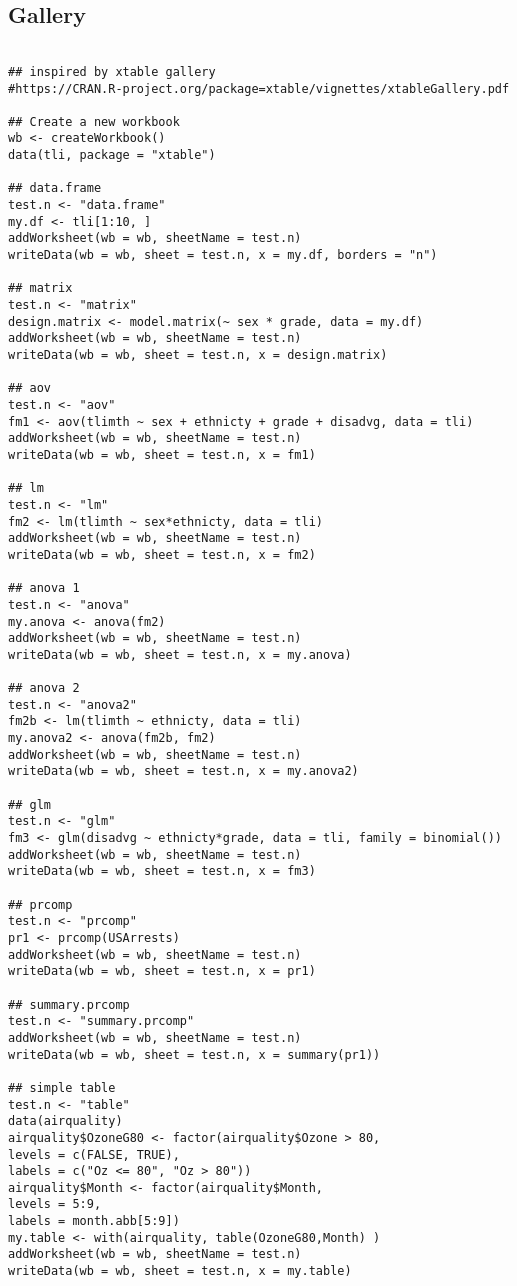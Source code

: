 \documentclass[11pt]{article}\usepackage[]{graphicx}\usepackage[]{color}
\begin{document}
\newpage
\subsection{Gallery}
\begin{verbatim}

## inspired by xtable gallery
#https://CRAN.R-project.org/package=xtable/vignettes/xtableGallery.pdf

## Create a new workbook
wb <- createWorkbook()
data(tli, package = "xtable")

## data.frame
test.n <- "data.frame"
my.df <- tli[1:10, ]
addWorksheet(wb = wb, sheetName = test.n)
writeData(wb = wb, sheet = test.n, x = my.df, borders = "n")

## matrix
test.n <- "matrix"
design.matrix <- model.matrix(~ sex * grade, data = my.df)
addWorksheet(wb = wb, sheetName = test.n)
writeData(wb = wb, sheet = test.n, x = design.matrix)

## aov
test.n <- "aov"
fm1 <- aov(tlimth ~ sex + ethnicty + grade + disadvg, data = tli)
addWorksheet(wb = wb, sheetName = test.n)
writeData(wb = wb, sheet = test.n, x = fm1)

## lm
test.n <- "lm"
fm2 <- lm(tlimth ~ sex*ethnicty, data = tli)
addWorksheet(wb = wb, sheetName = test.n)
writeData(wb = wb, sheet = test.n, x = fm2)

## anova 1 
test.n <- "anova"
my.anova <- anova(fm2)
addWorksheet(wb = wb, sheetName = test.n)
writeData(wb = wb, sheet = test.n, x = my.anova)

## anova 2
test.n <- "anova2"
fm2b <- lm(tlimth ~ ethnicty, data = tli)
my.anova2 <- anova(fm2b, fm2)
addWorksheet(wb = wb, sheetName = test.n)
writeData(wb = wb, sheet = test.n, x = my.anova2)

## glm
test.n <- "glm"
fm3 <- glm(disadvg ~ ethnicty*grade, data = tli, family = binomial())
addWorksheet(wb = wb, sheetName = test.n)
writeData(wb = wb, sheet = test.n, x = fm3)

## prcomp
test.n <- "prcomp"
pr1 <- prcomp(USArrests)
addWorksheet(wb = wb, sheetName = test.n)
writeData(wb = wb, sheet = test.n, x = pr1)

## summary.prcomp
test.n <- "summary.prcomp"
addWorksheet(wb = wb, sheetName = test.n)
writeData(wb = wb, sheet = test.n, x = summary(pr1))

## simple table
test.n <- "table"
data(airquality)
airquality$OzoneG80 <- factor(airquality$Ozone > 80,
levels = c(FALSE, TRUE),
labels = c("Oz <= 80", "Oz > 80"))
airquality$Month <- factor(airquality$Month,
levels = 5:9,
labels = month.abb[5:9])
my.table <- with(airquality, table(OzoneG80,Month) )
addWorksheet(wb = wb, sheetName = test.n)
writeData(wb = wb, sheet = test.n, x = my.table)


\end{verbatim}
\end{document}
